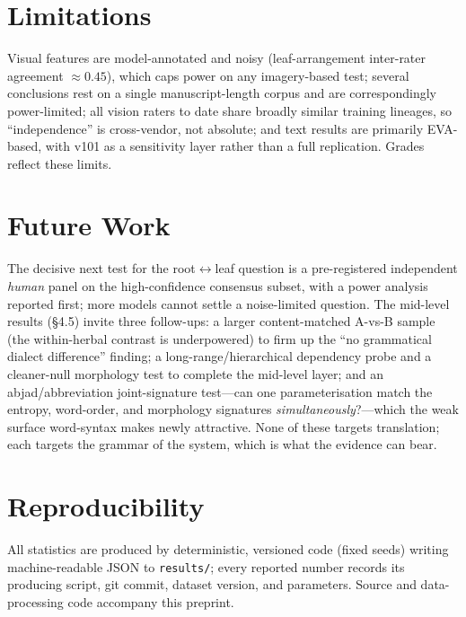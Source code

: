 \documentclass[11pt]{article}
\begin{document}
\section{Limitations}
Visual features are model-annotated and noisy (leaf-arrangement inter-rater agreement
$\approx 0.45$), which caps power on any imagery-based test; several conclusions rest
on a single manuscript-length corpus and are correspondingly power-limited; all
vision raters to date share broadly similar training lineages, so ``independence'' is
cross-vendor, not absolute; and text results are primarily EVA-based, with v101 as a
sensitivity layer rather than a full replication. Grades reflect these limits.

\section{Future Work}
The decisive next test for the root$\leftrightarrow$leaf question is a pre-registered
independent \emph{human} panel on the high-confidence consensus subset, with a power
analysis reported first; more models cannot settle a noise-limited question. The
mid-level results (\S4.5) invite three follow-ups: a larger content-matched A-vs-B
sample (the within-herbal contrast is underpowered) to firm up the ``no grammatical
dialect difference'' finding; a long-range/hierarchical dependency probe and a
cleaner-null morphology test to complete the mid-level layer; and an
abjad/abbreviation joint-signature test---can one parameterisation match the entropy,
word-order, and morphology signatures \emph{simultaneously}?---which the weak surface
word-syntax makes newly attractive. None of these targets translation; each targets the
grammar of the system, which is what the evidence can bear.

\section*{Reproducibility}
All statistics are produced by deterministic, versioned code (fixed seeds) writing
machine-readable JSON to \texttt{results/}; every reported number records its
producing script, git commit, dataset version, and parameters. Source and
data-processing code accompany this preprint.



\end{document}
